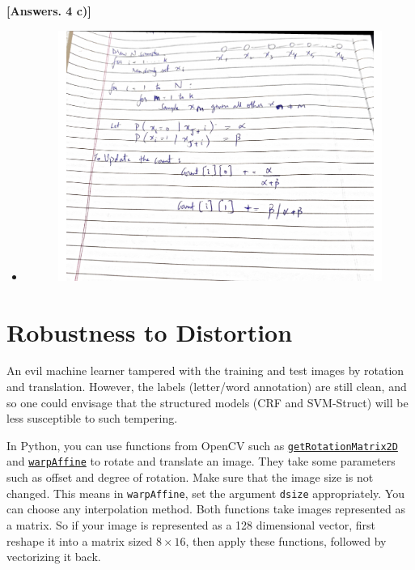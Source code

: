 \documentclass[11pt]{report}
\begin{document}
  {\bf [Answers. 4 c)]} 
	\begin{itemize}
	    \item 
	    	\begin{figure}[H]
            	\centering
            \includegraphics[width=15cm]{Figures/Rao_blackw.pdf}
            	\end{figure}
	\end{itemize}



\section{Robustness to Distortion}

An evil machine learner tampered with the training and test images by rotation and translation.
However, the labels (letter/word annotation) are still clean, and so
one could envisage that the structured models (CRF and SVM-Struct) will be less susceptible to such tempering.



In Python, you can use functions from OpenCV such as
\href{https://docs.opencv.org/3.4/da/d54/group__imgproc__transform.html#gafbbc470ce83812914a70abfb604f4326}{\texttt{getRotationMatrix2D}} and \href{https://docs.opencv.org/3.4/da/d54/group__imgproc__transform.html#ga0203d9ee5fcd28d40dbc4a1ea4451983}{\texttt{warpAffine}} to rotate and translate an image. 
They take some parameters such as offset and degree of rotation.
Make sure that the image size is not changed. 
This means in \texttt{warpAffine}, set the argument \verb#dsize# appropriately.
You can choose any interpolation method.
%
Both functions take images represented as a matrix.
So if your image is represented as a 128 dimensional vector,
first reshape it into a matrix sized $8 \times 16$,
then apply these functions,
followed by vectorizing it back.
\end{document}

